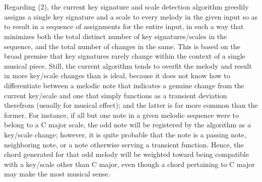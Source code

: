 \documentclass[twoside]{article}
\begin{document}
	\\\\
	Regarding (2), the current key signature and scale detection algorithm greedily assigns a single key signature and a scale to every melody in the given input so as to result in a sequence of assignments for the entire input, in such a way that minimizes both the total distinct number of key signatures/scales in the sequence, and the total number of changes in the same. This is based on the broad premise that key signatures rarely change within the context of a single musical piece. Still, the current algorithm tends to overfit the melody and result in more key/scale changes than is ideal, because it does not know how to differentiate between a melodic note that indicates a genuine change from the current key/scale and one that simply functions as a transient deviation therefrom (usually for musical effect); and the latter is far more common than the former. For instance, if all but one note in a given melodic sequence were to belong to a C major scale, the odd note will be registered by the algorithm as a key/scale change; however, it is quite probable that the note is a passing note, neighboring note, or a note otherwise serving a transient function. Hence, the chord generated for that odd melody will be weighted toward being compatible with a key/scale other than C major, even though a chord pertaining to C major may make the most musical sense.
\end{document}
